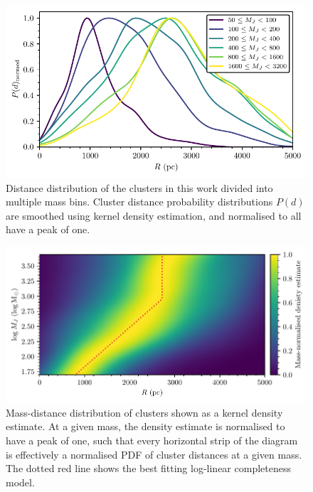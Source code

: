 \begin{figure}[t]
    \centering
    \includegraphics[width=\textwidth]{fig/c4/discussion_completeness.pdf}
    \caption[Distance distribution of the clusters in this work divided into multiple mass bins]{Distance distribution of the clusters in this work divided into multiple mass bins. Cluster distance probability distributions $P(d)$ are smoothed using kernel density estimation, and normalised to all have a peak of one.}
    \label{fig:dynamics:discussion:completeness}
\end{figure}

\begin{figure}[t]
    \centering
    \includegraphics[width=\textwidth]{fig/c4/discussion_completeness_kde.pdf}
    \caption[Mass-distance distribution of clusters shown as a kernel density estimate]{Mass-distance distribution of clusters shown as a kernel density estimate. At a given mass, the density estimate is normalised to have a peak of one, such that every horizontal strip of the diagram is effectively a normalised PDF of cluster distances at a given mass. The dotted red line shows the best fitting log-linear completeness model.}
    \label{fig:dynamics:discussion:completeness_kde}
\end{figure}

